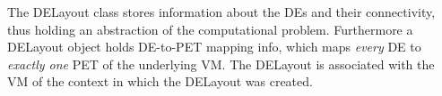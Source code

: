 

The DELayout class stores information about the DEs and their connectivity, thus holding an abstraction of the computational problem. Furthermore a DELayout object holds DE-to-PET mapping info, which maps {\it every} DE to {\it exactly one} PET of the underlying VM. The DELayout is associated with the VM of the context in which the DELayout was created.






